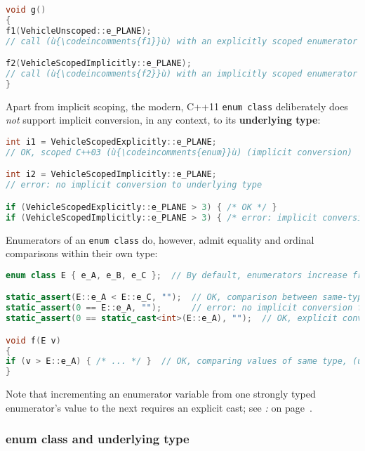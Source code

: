 \begin{lstlisting}[language=C++]
void g()
{
f1(VehicleUnscoped::e_PLANE);
// call (ù{\codeincomments{f1}}ù) with an explicitly scoped enumerator

f2(VehicleScopedImplicitly::e_PLANE);
// call (ù{\codeincomments{f2}}ù) with an implicitly scoped enumerator
}
\end{lstlisting}

\noindent Apart from implicit scoping, the modern, C++11
\texttt{enum}~\texttt{class} deliberately does \emph{not} support
implicit conversion, in any context, to its \textbf{underlying type}:

\begin{lstlisting}[language=C++]
int i1 = VehicleScopedExplicitly::e_PLANE;
// OK, scoped C++03 (ù{\codeincomments{enum}}ù) (implicit conversion)

int i2 = VehicleScopedImplicitly::e_PLANE;
// error: no implicit conversion to underlying type

if (VehicleScopedExplicitly::e_PLANE > 3) { /* OK */ }
if (VehicleScopedImplicitly::e_PLANE > 3) { /* error: implicit conversion */ }
\end{lstlisting}

\noindent Enumerators of an \texttt{enum}~\texttt{class} do, however, admit
equality and ordinal comparisons within their own type:

\begin{lstlisting}[language=C++]
enum class E { e_A, e_B, e_C };  // By default, enumerators increase from 0.

static_assert(E::e_A < E::e_C, "");  // OK, comparison between same-type values
static_assert(0 == E::e_A, "");      // error: no implicit conversion from (ù{\codeincomments{E}}ù)
static_assert(0 == static_cast<int>(E::e_A), "");  // OK, explicit conversion

void f(E v)
{
if (v > E::e_A) { /* ... */ }  // OK, comparing values of same type, (ù{\codeincomments{E}}ù)
}
\end{lstlisting}

\noindent Note that incrementing an enumerator variable from one strongly typed
enumerator's value to the next requires an explicit cast; see \textit{: } on page~\pageref{strong-typing-of-an-enum-class-can-be-counterproductive}.

\subsubsection[{\tt enum} {\tt class} and underlying type]{{\SubsubsecCode enum} {\SubsubsecCode class} and underlying type}\label{enum-class-and-underlying-type}

